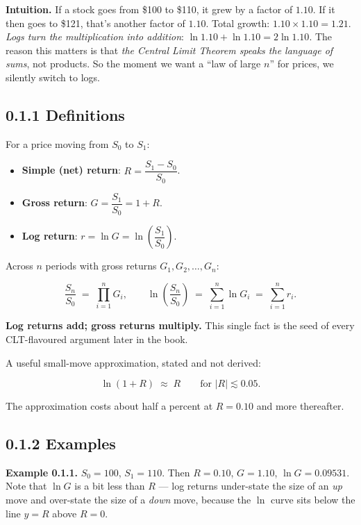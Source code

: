 \documentclass[
  10pt,
  twoside]{book}
\providecommand{\tightlist}{%
  \setlength{\itemsep}{0pt}\setlength{\parskip}{0pt}}
\begin{document}
\textbf{Intuition.} If a stock goes from \$100 to \$110, it grew by a
factor of \(1.10\). If it then goes to \$121, that's another factor of
\(1.10\). Total growth: \(1.10 \times 1.10 = 1.21\). \emph{Logs turn the
multiplication into addition}: \(\ln 1.10 + \ln 1.10 = 2\ln 1.10\). The
reason this matters is that \emph{the Central Limit Theorem speaks the
language of sums}, not products. So the moment we want a ``law of large
\(n\)'' for prices, we silently switch to logs.

\subsection{0.1.1 Definitions}\label{definitions}

For a price moving from \(S_0\) to \(S_1\):

\begin{itemize}
\tightlist
\item
  \textbf{Simple (net) return}: \(R = \dfrac{S_1 - S_0}{S_0}\).
\item
  \textbf{Gross return}: \(G = \dfrac{S_1}{S_0} = 1 + R\).
\item
  \textbf{Log return}:
  \(r = \ln G = \ln\!\left(\dfrac{S_1}{S_0}\right)\).
\end{itemize}

Across \(n\) periods with gross returns \(G_1, G_2, \dots, G_n\):

\[\frac{S_n}{S_0} \;=\; \prod_{i=1}^{n} G_i, \qquad \ln\!\left(\frac{S_n}{S_0}\right) \;=\; \sum_{i=1}^{n} \ln G_i \;=\; \sum_{i=1}^{n} r_i.\]

\textbf{Log returns add; gross returns multiply.} This single fact is
the seed of every CLT-flavoured argument later in the book.

A useful small-move approximation, stated and not derived:

\[\ln(1 + R) \;\approx\; R \qquad \text{for } |R| \lesssim 0.05.\]

The approximation costs about half a percent at \(R = 0.10\) and more
thereafter.

\subsection{0.1.2 Examples}\label{examples}

\textbf{Example 0.1.1.} \(S_0 = 100\), \(S_1 = 110\). Then \(R = 0.10\),
\(G = 1.10\), \(\ln G = 0.09531\). Note that \(\ln G\) is a bit less
than \(R\) --- log returns under-state the size of an \emph{up} move and
over-state the size of a \emph{down} move, because the \(\ln\) curve
sits below the line \(y = R\) above \(R = 0\).
\end{document}

